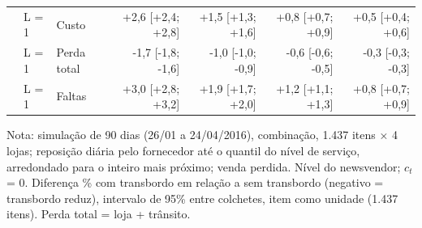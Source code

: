 \begin{table}[htbp]
\begin{tabular}{lllrrrr}
 & L = 1 & Custo & +2,6 [+2,4; +2,8] & +1,5 [+1,3; +1,6] & +0,8 [+0,7; +0,9] & +0,5 [+0,4; +0,6] \\
 & L = 1 & Perda total & -1,7 [-1,8; -1,6] & -1,0 [-1,0; -0,9] & -0,6 [-0,6; -0,5] & -0,3 [-0,3; -0,3] \\
 & L = 1 & Faltas & +3,0 [+2,8; +3,2] & +1,9 [+1,7; +2,0] & +1,2 [+1,1; +1,3] & +0,8 [+0,7; +0,9] \\
\bottomrule
\end{tabular}
\par\smallskip
{\footnotesize Nota: simulação de 90 dias (26/01 a 24/04/2016), combinação, 1.437 itens × 4 lojas; reposição diária pelo fornecedor até o quantil do nível de serviço, arredondado para o inteiro mais próximo; venda perdida. Nível do newsvendor; $c_t$ = 0. Diferença \% com transbordo em relação a sem transbordo (negativo = transbordo reduz), intervalo de 95\% entre colchetes, item como unidade (1.437 itens). Perda total = loja + trânsito.}
\end{table}
